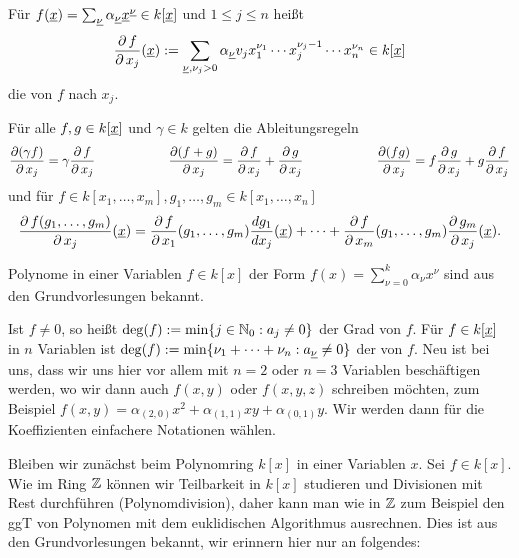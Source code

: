 \begin{defn}
	Für $f(\uline{x}) = \sum_{\uline{\nu}} \alpha_{\uline{\nu}} \uline{x}^{\uline{\nu}} \in k[\uline{x}]$ und $1 \leq j \leq n$ heißt
	\[ \frac{\der f}{\der x_j}(\uline{x}) := \sum_{\uline{\nu}, \nu_j > 0} \alpha_{\uline{\nu}} v_j x_1^{\nu_1} \cdots x_j^{\nu_j-1} \cdots x_n^{\nu_n} \in k[\uline{x}] \]
	die  von $f$ nach $x_j$.
\end{defn}

\begin{satz}
\label{satz_7.4}
	Für alle $f,g \in k[\uline{x}]$ und $\gamma \in k$ gelten die Ableitungsregeln
	\[ \frac{\operatorname{\partial}(\gamma f)}{\operatorname{\partial} x_j} = \gamma \frac{\operatorname{\partial} f}{\operatorname{\partial} x_j} \hspace{2cm} \frac{\operatorname{\partial}(f+g)}{\operatorname{\partial} x_j} = \frac{\operatorname{\partial} f}{\operatorname{\partial} x_j} + \frac{\operatorname{\partial} g}{\operatorname{\partial} x_j} \hspace{2cm} \frac{\operatorname{\partial}(fg)}{\operatorname{\partial} x_j} = f \frac{\operatorname{\partial} g}{\operatorname{\partial} x_j} + g \frac{\operatorname{\partial} f}{\operatorname{\partial} x_j} \]
	und für $f \in k[x_1, \dots,x_m], g_1,\dots, g_m \in k[x_1,\dots, x_n]$
	\[ \frac{\der f(g_1,\dots, g_m)}{\der x_j}(\uline{x}) = \frac{\der f}{\der x_1} (g_1,\dots,g_m) \frac{dg_1}{dx_j}(\uline{x}) + \dots + \frac{\der f}{\der x_m} (g_1,\dots,g_m) \frac{\der g_m}{\der x_j}(\uline{x}). \]
\end{satz}

Polynome in einer Variablen $f \in k[x]$ der Form $f(x) = \sum_{\nu = 0}^{k} \alpha_\nu x^\nu$ sind aus den Grundvorlesungen bekannt.
\begin{defn}[Grad]
	Ist $f \neq 0$, so heißt $\deg(f) := \min\{j \in \mathbb{N}_0 : a_j \neq 0\}$ der Grad von $f$. Für $f \in k[\uline{x}]$ in $n$ Variablen ist $\deg(f) := \min\{\nu_1 + \dots + \nu_n : a_{\uline{\nu}} \neq 0\}$ der  von $f$. Neu ist bei uns, dass wir uns hier vor allem mit $n = 2$ oder $n = 3$ Variablen beschäftigen werden, wo wir dann auch $f(x,y)$ oder $f(x,y,z)$ schreiben möchten, zum Beispiel $f(x,y) = \alpha_{(2,0)} x^2 + \alpha_{(1,1)} xy + \alpha_{(0,1)}y$. Wir werden dann für die Koeffizienten einfachere Notationen wählen.
\end{defn}

\begin{bem}
	Bleiben wir zunächst beim Polynomring $k[x]$ in einer Variablen $x$. Sei $f \in k[x]$. Wie im Ring $\mathbb{Z}$ können wir Teilbarkeit in $k[x]$ studieren und Divisionen mit Rest durchführen (Polynomdivision), daher kann man wie in $\mathbb{Z}$ zum Beispiel den ggT von Polynomen mit dem euklidischen Algorithmus ausrechnen. Dies ist aus den Grundvorlesungen bekannt, wir erinnern hier nur an folgendes:
\end{bem}


